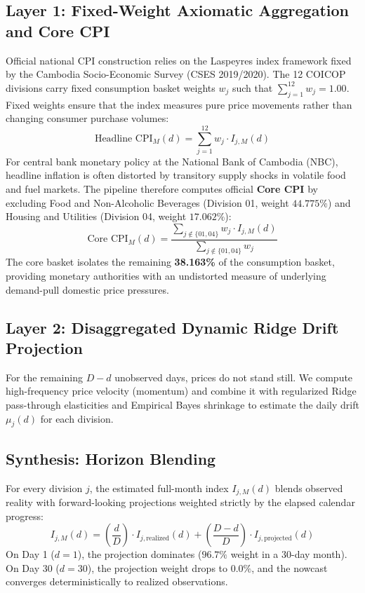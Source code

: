 \documentclass[a4paper, 11pt]{article}
\begin{document}
\subsection{Layer 1: Fixed-Weight Axiomatic Aggregation and Core CPI}
Official national CPI construction relies on the Laspeyres index framework fixed by the Cambodia Socio-Economic Survey (CSES 2019/2020). The 12 COICOP divisions carry fixed consumption basket weights $w_j$ such that $\sum_{j=1}^{12} w_j = 1.00$. Fixed weights ensure that the index measures pure price movements rather than changing consumer purchase volumes:
\begin{equation}
    \text{Headline CPI}_M(d) = \sum_{j=1}^{12} w_j \cdot I_{j, M}(d)
\end{equation}
For central bank monetary policy at the National Bank of Cambodia (NBC), headline inflation is often distorted by transitory supply shocks in volatile food and fuel markets. The pipeline therefore computes official \textbf{Core CPI} by excluding Food and Non-Alcoholic Beverages (Division 01, weight $44.775\%$) and Housing and Utilities (Division 04, weight $17.062\%$):
\begin{equation}
    \boxed{\text{Core CPI}_M(d) = \frac{\sum_{j \notin \{01, 04\}} w_j \cdot I_{j, M}(d)}{\sum_{j \notin \{01, 04\}} w_j}}
\end{equation}
The core basket isolates the remaining \textbf{38.163\%} of the consumption basket, providing monetary authorities with an undistorted measure of underlying demand-pull domestic price pressures.

\subsection{Layer 2: Disaggregated Dynamic Ridge Drift Projection}
For the remaining $D - d$ unobserved days, prices do not stand still. We compute high-frequency price velocity (momentum) and combine it with regularized Ridge pass-through elasticities and Empirical Bayes shrinkage to estimate the daily drift $\mu_j(d)$ for each division.

\subsection{Synthesis: Horizon Blending}
For every division $j$, the estimated full-month index $I_{j, M}(d)$ blends observed reality with forward-looking projections weighted strictly by the elapsed calendar progress:
\begin{equation}
    I_{j, M}(d) = \left( \frac{d}{D} \right) \cdot I_{j, \text{realized}}(d) + \left( \frac{D - d}{D} \right) \cdot I_{j, \text{projected}}(d)
    \label{eq:blending}
\end{equation}
On Day 1 ($d=1$), the projection dominates ($96.7\%$ weight in a 30-day month). On Day 30 ($d=30$), the projection weight drops to $0.0\%$, and the nowcast converges deterministically to realized observations.
\end{document}

